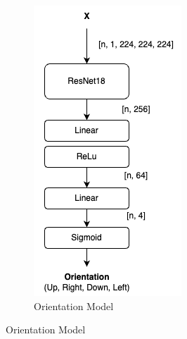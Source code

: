 \begin{figure}[htbp]
    \centering
    \begin{subfigure}{0.2\linewidth}
        \centering
        \includegraphics[width=\linewidth]{images/OrientationModel.png}
        \caption{Orientation Model}
        \label{fig:orientation_model}

\end{subfigure}
\end{figure}
